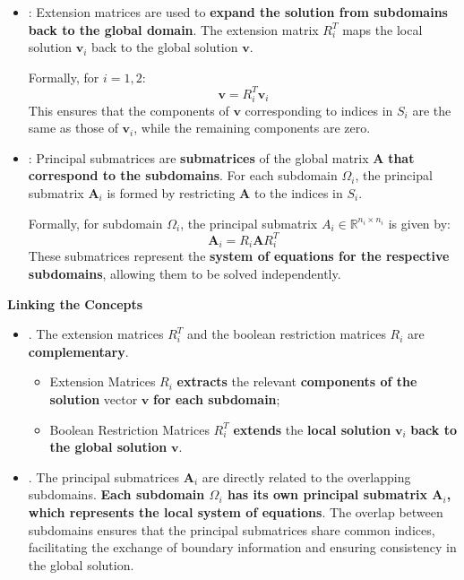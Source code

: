 \begin{itemize}
    \item {}: Extension matrices are used to \textbf{expand the solution from subdomains back to the global domain}. The extension matrix $R_{i}^{T}$ maps the local solution $\mathbf{v}_{i}$ back to the global solution $\mathbf{v}$.

    Formally, for $i = 1, 2$:
    \begin{equation*}
        \mathbf{v} = R_{i}^{T} \mathbf{v}_{i}
    \end{equation*}
    This ensures that the components of $\mathbf{v}$ corresponding to indices in $S_{i}$ are the same as those of $\mathbf{v}_{i}$, while the remaining components are zero.


    \item {}: Principal submatrices are \textbf{submatrices} of the global matrix $\mathbf{A}$ \textbf{that correspond to the subdomains}. For each subdomain $\Omega_{i}$, the principal submatrix $\mathbf{A}_{i}$ is formed by restricting $\mathbf{A}$ to the indices in $S_{i}$.

    Formally, for subdomain $\Omega_{i}$, the principal submatrix $A_{i} \in \mathbb{R}^{n_{i} \times n_{i}}$ is given by:
    \begin{equation*}
        \mathbf{A}_{i} = R_{i} \mathbf{A} R_{i}^{T}
    \end{equation*}
    These submatrices represent the \textbf{system of equations for the respective subdomains}, allowing them to be solved independently.
\end{itemize}

\begin{flushleft}
    \textcolor{Green3}{ \textbf{Linking the Concepts}}
\end{flushleft}
\begin{itemize}
    \item {}. The extension matrices $R_i^T$ and the boolean restriction matrices $R_i$ are \textbf{complementary}.
    \begin{itemize}
    	\item Extension Matrices $R_{i}$ \textbf{extracts} the relevant \textbf{components of the solution} vector $\mathbf{v}$ \textbf{for each subdomain};
    	\item Boolean Restriction Matrices $R_{i}^{T}$ \textbf{extends} the \textbf{local solution} $\mathbf{v}_{i}$ \textbf{back to the global solution} $\mathbf{v}$.
    \end{itemize}

    \item {}. The principal submatrices $\mathbf{A}_{i}$ are directly related to the overlapping subdomains. \textbf{Each subdomain $\Omega_{i}$ has its own principal submatrix $\mathbf{A}_{i}$, which represents the local system of equations}. The overlap between subdomains ensures that the principal submatrices share common indices, facilitating the exchange of boundary information and ensuring consistency in the global solution.
\end{itemize}

